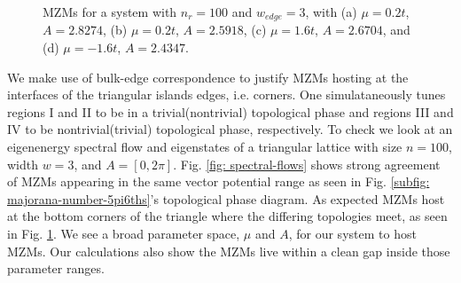 \documentclass[aps,prb,showpacs,amsmath,amssymb,superscriptaddress]{revtex4-2}
\begin{document}
\begin{figure}[]
  \hfill
  \hfill
  \hfill
  \hfill
  \caption{MZMs for a system with $n_r=100$ and $w_{edge}=3$, with (a) $\mu=0.2t$, $A = 2.8274$, (b) $\mu=0.2t$, $A = 2.5918$, (c) $\mu=1.6t$, $A = 2.6704$, and (d) $\mu=-1.6t$, $A = 2.4347$.}
  \label{fig: mzm-wavefunctions}
\end{figure}

We make use of bulk-edge correspondence to justify MZMs hosting at the interfaces of the triangular islands edges, i.e. corners.
One simulataneously tunes regions I and II to be in a trivial(nontrivial) topological phase and regions III and IV to be nontrivial(trivial) topological phase, respectively.
To check we look at an eigenenergy spectral flow and eigenstates of a triangular lattice with size $n=100$, width $w=3$, and $A = [0,2\pi]$.
Fig. \ref{fig: spectral-flows} shows strong agreement of MZMs appearing in the same vector potential range as seen in Fig. \ref{subfig: majorana-number-5pi6ths}'s topological phase diagram.
As expected MZMs host at the bottom corners of the triangle where the differing topologies meet, as seen in Fig. \ref{fig: mzm-wavefunctions}.
We see a broad parameter space, $\mu$ and $A$, for our system to host MZMs.
Our calculations also show the MZMs live within a clean gap inside those parameter ranges.
\end{document}
